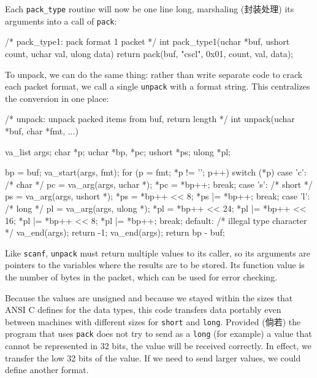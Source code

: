 Each \verb'pack_type' routine will now be one line long, marshaling
(封装处理) its arguments into a call of \verb'pack':
\begin{wellcode}
    /* pack_type1: pack format 1 packet */
    int pack_type1(uchar *buf, ushort count, uchar val, ulong data)
    {
        return pack(buf, "cscl", 0x01, count, val, data);
    }
\end{wellcode}

To unpack, we can do the same thing: rather than write separate code to
crack each packet format, we call a single \verb'unpack' with a format
string. This centralizes the conversion in one place:
\begin{wellcode}
    /* unpack: unpack packed items from buf, return length */
    int unpack(uchar *buf, char *fmt, ...)
    {
        va_list args;
        char    *p;
        uchar   *bp, *pc;
        ushort  *ps;
        ulong   *pl;

        bp = buf;
        va_start(args, fmt);
        for (p = fmt; *p != '\0'; p++) {
            switch (*p) {
            case 'c':   /* char */
                pc = va_arg(args, uchar *);
                *pc = *bp++;
                break;
            case 's':   /* short */
                ps = va_arg(args, ushort *);
                *ps = *bp++ << 8;
                *ps |= *bp++;
                break;
            case 'l':   /* long */
                pl = va_arg(args, ulong *);
                *pl = *bp++ << 24;
                *pl |= *bp++ << 16;
                *pl |= *bp++ << 8;
                *pl |= *bp++;
                break;
            default:    /* illegal type character */
                va_end(args);
                return -1;
            }
        }
        va_end(args);
        return bp - buf;
    }
\end{wellcode}
Like \verb'scanf', \verb'unpack' must return multiple values to its caller,
so its arguments are pointers to the variables where the results are to be
stored. Its function value is the number of bytes in the packet, which can
be used for error checking.

Because the values are unsigned and because we stayed within the sizes that
ANSI C defines for the data types, this code transfers data portably even
between machines with different sizes for \verb'short' and \verb'long'.
Provided (倘若) the program that uses \verb'pack' does not try to send as a
\verb'long' (for example) a value that cannot be represented in 32 bits,
the value will be received correctly. In effect, we transfer the low 32
bits of the value.  If we need to send larger values, we could define
another format.

